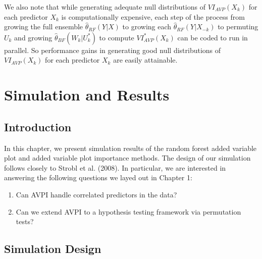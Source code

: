 \documentclass[12pt,twoside]{reedthesis}
\theoremstyle{definition}
\theoremstyle{definition}
\theoremstyle{definition}
\theoremstyle{remark}
\begin{document}
We also note that while generating adequate null distributions of
\(VI_{AVP}(X_k)\) for each predictor \(X_k\) is computationally
expensive, each step of the process from growing the full ensemble
\(\hat{\theta}_{RF}(Y|X)\) to growing each
\(\hat{\theta}_{RF}(Y|X_{-k})\) to permuting \(U_k\) and growing
\(\hat{\theta}_{BF}(W_k|U_k^*)\) to compute \(VI_{AVP}^*(X_k)\) can be
coded to run in parallel. So performance gains in generating good null
distributions of \(VI_{AVP}(X_k)\) for each predictor \(X_k\) are easily
attainable. \par

\chapter{Simulation and Results}\label{simulation-and-results}

\section{Introduction}\label{introduction-3}

In this chapter, we present simulation results of the random forest
added variable plot and added variable plot importance methods. The
design of our simulation follows closely to Strobl et al. (2008). In
particular, we are interested in answering the following questions we
layed out in Chapter 1:
\begin{enumerate}
  \item Can AVPI handle correlated predictors in the data? 
  \item Can we extend AVPI to a hypothesis testing framework via permutation tests?
  \end{enumerate}
\par

\section{Simulation Design}\label{simulation-design}
\end{document}
